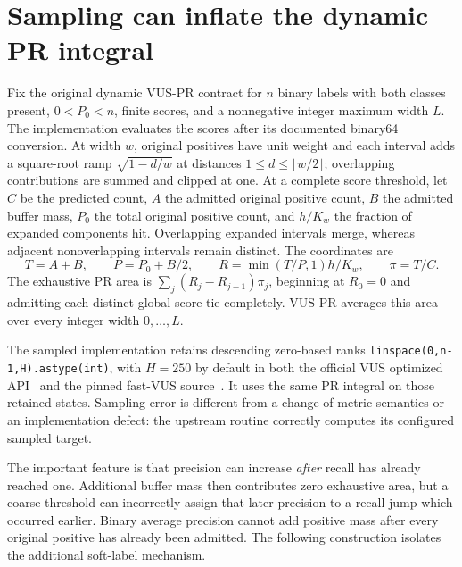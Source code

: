 \section{Sampling can inflate the dynamic PR integral}
\label{sec:sampling-inflation}
Fix the original dynamic VUS-PR contract for $n$ binary labels with both
classes present, $0<P_0<n$, finite scores, and a nonnegative integer
maximum width $L$. The implementation evaluates the scores after its
documented binary64 conversion. At width $w$, original positives
have unit weight and each interval adds a square-root ramp
$\sqrt{1-d/w}$ at distances $1\leq d\leq\lfloor w/2\rfloor$;
overlapping contributions are summed and clipped at one. At a complete
score threshold, let $C$ be the predicted count, $A$ the admitted original
positive count, $B$ the admitted buffer mass, $P_0$ the total original
positive count, and $h/K_w$ the fraction of expanded components hit.
Overlapping expanded intervals merge, whereas adjacent nonoverlapping
intervals remain distinct. The coordinates are
\[
 T=A+B,\qquad P=P_0+B/2,\qquad
 R=\min(T/P,1)h/K_w,\qquad \pi=T/C.
\]
The exhaustive PR area is $\sum_j(R_j-R_{j-1})\pi_j$, beginning at
$R_0=0$ and admitting each distinct global score tie completely. VUS-PR
averages this area over every integer width $0,\ldots,L$.

The sampled implementation retains descending zero-based ranks
\texttt{linspace(0,n-1,H).astype(int)}, with $H=250$ by default
in both the official VUS optimized API~\citep{officialvuscode} and
the pinned fast-VUS source~\citep{klein2026}. It uses the same PR
integral on those retained states. Sampling error is different from a
change of metric semantics or an implementation defect: the upstream
routine correctly computes its configured sampled target.

The important feature is that precision can increase \emph{after} recall
has already reached one. Additional buffer mass then contributes zero
exhaustive area, but a coarse threshold can incorrectly assign that later
precision to a recall jump which occurred earlier. Binary average
precision cannot add positive mass after every original positive has
already been admitted. The following construction isolates the additional
soft-label mechanism.

